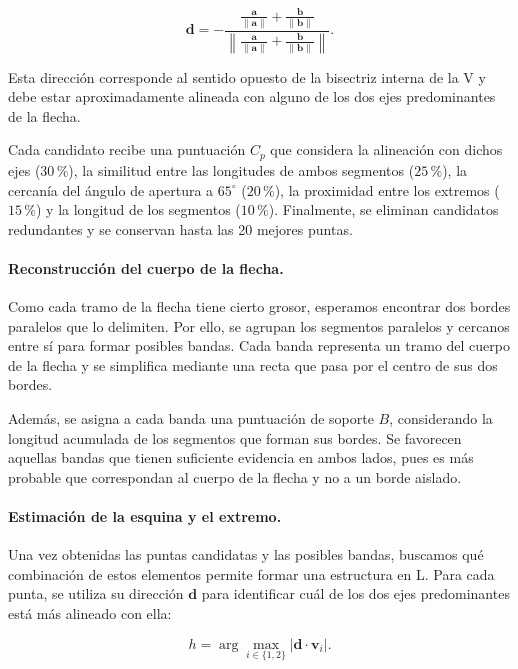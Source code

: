\documentclass[11pt,a4paper]{article}
\begin{document}
\begin{equation}
    \mathbf d=
    -\frac{
    \frac{\mathbf a}{\|\mathbf a\|}
    +
    \frac{\mathbf b}{\|\mathbf b\|}
    }{
    \left\|
    \frac{\mathbf a}{\|\mathbf a\|}
    +
    \frac{\mathbf b}{\|\mathbf b\|}
    \right\|
    }.
\end{equation}

Esta dirección corresponde al sentido opuesto de la bisectriz interna de la V y debe estar aproximadamente alineada con alguno de los dos ejes predominantes de la flecha.

Cada candidato recibe una puntuación $C_p$ que considera la alineación con dichos ejes ($30\,\%$), la similitud entre las longitudes de ambos segmentos ($25\,\%$), la cercanía del ángulo de apertura a $65^\circ$ ($20\,\%$), la proximidad entre los extremos ($15\,\%$) y la longitud de los segmentos ($10\,\%$). Finalmente, se eliminan candidatos redundantes y se conservan hasta las 20 mejores puntas.


\paragraph{Reconstrucción del cuerpo de la flecha.}

Como cada tramo de la flecha tiene cierto grosor, esperamos encontrar dos bordes paralelos que lo delimiten. Por ello, se agrupan los segmentos paralelos y cercanos entre sí para formar posibles bandas. Cada banda representa un tramo del cuerpo de la flecha y se simplifica mediante una recta que pasa por el centro de sus dos bordes.

Además, se asigna a cada banda una puntuación de soporte $B$, considerando la longitud acumulada de los segmentos que forman sus bordes. Se favorecen aquellas bandas que tienen suficiente evidencia en ambos lados, pues es más probable que correspondan al cuerpo de la flecha y no a un borde aislado.


\paragraph{Estimación de la esquina y el extremo.}

Una vez obtenidas las puntas candidatas y las posibles bandas, buscamos qué combinación de estos elementos permite formar una estructura en L. Para cada punta, se utiliza su dirección $\mathbf d$ para identificar cuál de los dos ejes predominantes está más alineado con ella:

\begin{equation}
    h=\arg\max_{i\in\{1,2\}}
    |\mathbf d\cdot\mathbf v_i|.
\end{equation}
\end{document}
